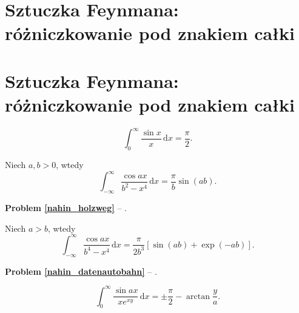 %

\section{Sztuczka Feynmana: różniczkowanie pod znakiem całki}
\section{Sztuczka Feynmana: różniczkowanie pod znakiem całki}

\begin{problem}
    \begin{equation}
        \int_0^\infty \frac{\sin x}{x} \,\mathrm{d}x = \frac \pi 2.
    \end{equation}
\end{problem}


\begin{problem_with_solution}
    \label{nahin_holzweg}%
    Niech $a, b > 0$, wtedy
    \begin{equation}
        \int_{-\infty}^\infty \frac{\cos ax}{b^2 - x^4} \,\mathrm{d} x = \frac{\pi}{b} \sin (ab).
    \end{equation}
\end{problem_with_solution}

\textbf{Problem \ref{nahin_holzweg}} -- \cite[s. 115, 375, 376]{nahin15}.

\begin{problem}
    \label{nahin_datenautobahn}%
    Niech $a > b$, wtedy
    \begin{equation}
        \int_{-\infty}^\infty \frac{\cos ax}{b^4 - x^4} \,\mathrm{d} x = \frac{\pi}{2b^3} [\sin (ab) + \exp (-ab)].
    \end{equation}
\end{problem}

\textbf{Problem \ref{nahin_datenautobahn}} -- \cite[s. 115, 376]{nahin15}.

\begin{problem}
    \begin{equation}
        \int_0^\infty \frac{\sin ax}{x e^{xy}} \,\mathrm{d}x = \pm \frac \pi 2 - \arctan \frac y a.
    \end{equation}
\end{problem}

